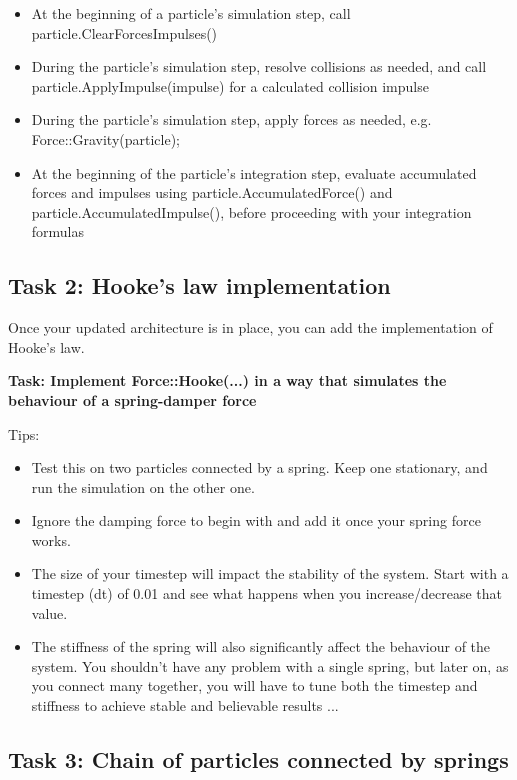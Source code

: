 \documentclass[12pt]{article}
\begin{document}
\begin{itemize}
\item At the beginning of a particle's simulation step, call particle.ClearForcesImpulses()
\item During the particle's simulation step, resolve collisions as needed, and call particle.ApplyImpulse(impulse) for a calculated collision impulse
\item During the particle's simulation step, apply forces as needed, e.g. Force::Gravity(particle);
\item At the beginning of the particle's integration step, evaluate accumulated forces and impulses using particle.AccumulatedForce() and particle.AccumulatedImpulse(), before proceeding with your integration formulas
\end{itemize}

\subsection*{Task 2: Hooke's law implementation}

Once your updated architecture is in place, you can add the implementation of Hooke's law.

\textbf{Task: Implement Force::Hooke(...) in a way that simulates the behaviour of a spring-damper force}

Tips:
\begin{itemize}
\item  Test this on two particles connected by a spring. Keep one stationary, and run the simulation on the other one.
\item  Ignore the damping force to begin with and add it once your spring force works.
\item  The size of your timestep will impact the stability of the system. Start with a timestep (dt) of 0.01 and see what happens when you increase/decrease that value.
\item  The stiffness of the spring will also significantly affect the behaviour of the system. You shouldn’t have any problem with a single spring, but later on, as you connect many together, you will have to tune both the timestep and stiffness to achieve stable and believable results ...
\end{itemize}

\subsection*{Task 3: Chain of particles connected by springs}
\end{document}
